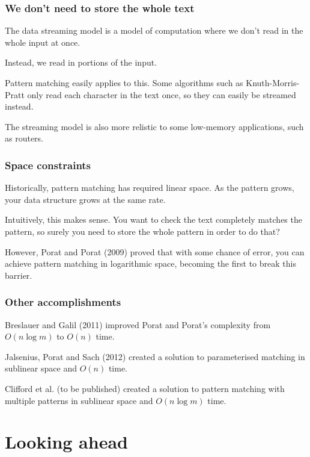 \documentclass{beamer}
\begin{document}

\begin{frame}
\frametitle{We don't need to store the whole text}
The data streaming model is a model of computation where we don't read in the whole input at once.

Instead, we read in portions of the input.

Pattern matching easily applies to this. Some algorithms such as Knuth-Morris-Pratt only read each character in the text once, so they can easily be streamed instead.

The streaming model is also more relistic to some low-memory applications, such as routers.
\end{frame}


\begin{frame}
\frametitle{Space constraints}
Historically, pattern matching has required linear space. As the pattern grows, your data structure grows at the same rate.

Intuitively, this makes sense. You want to check the text completely matches the pattern, so surely you need to store the whole pattern in order to do that?

However, Porat and Porat (2009) proved that with some chance of error, you can achieve pattern matching in logarithmic space, becoming the first to break this barrier.
\end{frame}


\begin{frame}
\frametitle{Other accomplishments}
Breslauer and Galil (2011) improved Porat and Porat's complexity from $O(n\log m)$ to $O(n)$ time.

Jalsenius, Porat and Sach (2012) created a solution to parameterised matching in sublinear space and $O(n)$ time.

Clifford et al. (to be published) created a solution to pattern matching with multiple patterns in sublinear space and $O(n\log m)$ time.
\end{frame}

\section{Looking ahead}
\end{document}
